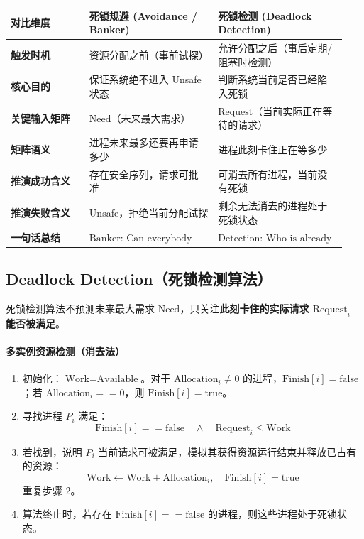 \documentclass[11pt,a4paper]{ctexart}
\newcommand{\kw}[1]{\textbf{#1}}
\begin{document}
\begingroup
\small
\renewcommand{\arraystretch}{1.25}
\setlength{\tabcolsep}{6pt}
\begin{tabularx}{\linewidth}{>{\bfseries}p{0.22\linewidth} p{0.36\linewidth} p{0.36\linewidth}}
\toprule
对比维度 & 死锁规避 (Avoidance / Banker) & 死锁检测 (Deadlock Detection)\\
\midrule
触发时机 & 资源分配之前（事前试探） & 允许分配之后（事后定期/阻塞时检测）\\
核心目的 & 保证系统绝不进入 Unsafe 状态 & 判断系统当前是否已经陷入死锁\\
关键输入矩阵 & $\text{Need}$（未来最大需求） & $\text{Request}$（当前实际正在等待的请求）\\
矩阵语义 & 进程未来最多还要再申请多少 & 进程此刻卡住正在等多少\\
推演成功含义 & 存在安全序列，请求可批准 & 可消去所有进程，当前没有死锁\\
推演失败含义 & Unsafe，拒绝当前分配试探 & 剩余无法消去的进程处于死锁状态\\
一句话总结 & $\boxed{\text{Banker: Can everybody still finish?}}$ & $\boxed{\text{Detection: Who is already unable to finish?}}$\\
\bottomrule
\end{tabularx}
\endgroup

\subsection{Deadlock Detection（死锁检测算法）}

死锁检测算法不预测未来最大需求 $\text{Need}$，只关注\kw{此刻卡住的实际请求 $\text{Request}_i$ 能否被满足}。

\paragraph{多实例资源检测（消去法）}
\begin{enumerate}
\item 初始化：$\text{Work} = \text{Available}$。对于 $\text{Allocation}_i \neq 0$ 的进程，$\text{Finish}[i] = \text{false}$；若 $\text{Allocation}_i == 0$，则 $\text{Finish}[i] = \text{true}$。
\item 寻找进程 $P_i$ 满足：
\[
\text{Finish}[i] == \text{false} \quad \land \quad \text{Request}_i \le \text{Work}
\]
\item 若找到，说明 $P_i$ 当前请求可被满足，模拟其获得资源运行结束并释放已占有的资源：
\[
\text{Work} \leftarrow \text{Work} + \text{Allocation}_i, \quad \text{Finish}[i] = \text{true}
\]
重复步骤 2。
\item 算法终止时，若存在 $\text{Finish}[i] == \text{false}$ 的进程，则这些进程处于死锁状态。
\end{enumerate}
\end{document}

